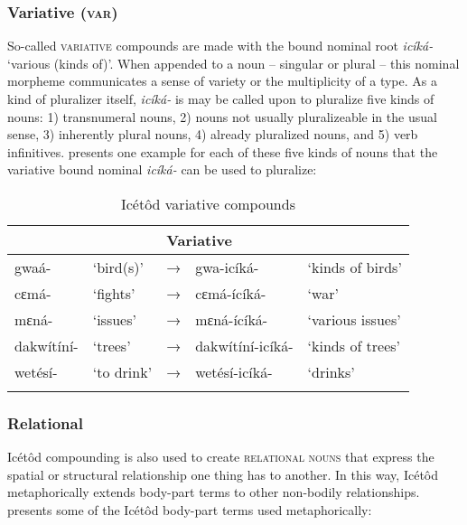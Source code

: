 \subsubsection{Variative (\textsc{var})}\label{sec:4.3.4}

So-called \textsc{variative} compounds are made with the bound nominal root \textit{icíká-} ‘various (kinds of)’. When appended to a noun – singular or plural – this nominal morpheme communicates a sense of variety or the multiplicity of a type. As a kind of pluralizer itself, \textit{icíká-} is may be called upon to pluralize five kinds of nouns: 1) transnumeral nouns, 2) nouns not usually pluralizeable in the usual sense, 3) inherently plural nouns, 4) already pluralized nouns, and 5) verb infinitives.  presents one example for each of these five kinds of nouns that the variative bound nominal \textit{icíká-} can be used to pluralize:


\begin{table}
\caption{Icétôd variative compounds}
\label{tab:nouns:var}


\begin{tabularx}{\textwidth}{XXXll}
\lsptoprule

\multicolumn{2}{X}{Singular/Plural} &  & \multicolumn{2}{X}{Variative}\\
\midrule
gwaá- & ‘bird(s)’ & → & gwa-icíká- & ‘kinds of birds’\\
cɛmá- & ‘fights’ & → & cɛmá-ícíká- & ‘war’\\
mɛná- & ‘issues’ & → & mɛná-ícíká- & ‘various issues’\\
dakwítíní- & ‘trees’ & → & dakwítíní-icíká- & ‘kinds of trees’\\
wetésí- & ‘to drink’ & → & wetésí-icíká- & ‘drinks’\\
\lspbottomrule
\end{tabularx}
\end{table}

\subsubsection{Relational}\label{sec:4.3.5} 

Icétôd compounding is also used to create \textsc{relational nouns} that express the spatial or structural relationship one thing has to another. In this way, Icétôd metaphorically extends body-part terms to other non-bodily relationships.  presents some of the Icétôd body-part terms used metaphorically:


